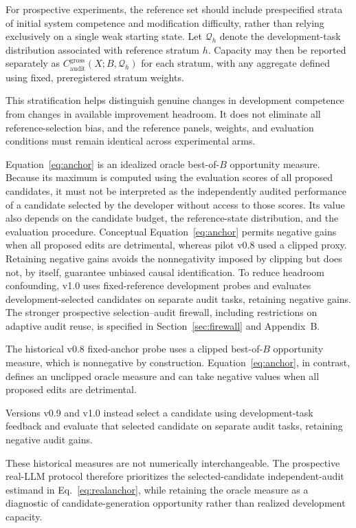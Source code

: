 \documentclass[11pt,a4paper]{article}
\begin{document}
For prospective experiments, the reference set should include prespecified strata of initial
system competence and modification difficulty, rather than relying exclusively on a single
weak starting state. Let $\mathcal{Q}_h$ denote the development-task distribution associated with reference stratum $h$. Capacity may then be reported separately as $C_{\mathrm{audit}}^{\mathrm{gross}}
(X;B,\mathcal{Q}_h)$ for each stratum, with any aggregate defined using fixed, preregistered stratum weights.

This stratification helps distinguish genuine changes in development competence from changes
in available improvement headroom. It does not eliminate all reference-selection bias,
and the reference panels, weights, and evaluation conditions must remain identical
across experimental arms.

Equation~\eqref{eq:anchor} is an idealized oracle best-of-$B$ opportunity measure. Because its maximum is computed using the evaluation scores of all proposed candidates, it must not be interpreted as the independently audited performance of a candidate selected by the developer without access to those scores. Its value also depends on the candidate budget, the reference-state distribution, and the
evaluation procedure. Conceptual Equation~\eqref{eq:anchor} permits negative gains when all proposed edits are detrimental, whereas pilot v0.8 used a clipped proxy. Retaining negative gains avoids the
nonnegativity imposed by clipping but does not, by itself, guarantee unbiased causal identification. To reduce headroom confounding, v1.0 uses fixed-reference development probes and evaluates development-selected candidates on separate audit tasks, retaining negative gains. The stronger prospective selection--audit firewall, including restrictions on adaptive audit reuse, is specified in Section~\ref{sec:firewall} and Appendix~B.

The historical v0.8 fixed-anchor probe uses a clipped best-of-$B$ opportunity measure, which is nonnegative by construction. Equation~\eqref{eq:anchor}, in contrast, defines an unclipped oracle measure and can take negative values when all proposed edits are detrimental.

Versions v0.9 and v1.0 instead select a candidate using development-task feedback and evaluate that selected candidate on separate audit tasks, retaining negative audit gains.

These historical measures are not numerically interchangeable. The prospective real-LLM protocol therefore prioritizes the selected-candidate independent-audit estimand in Eq.~\eqref{eq:realanchor}, while retaining the oracle measure as a diagnostic of candidate-generation opportunity rather
than realized development capacity.
\end{document}

